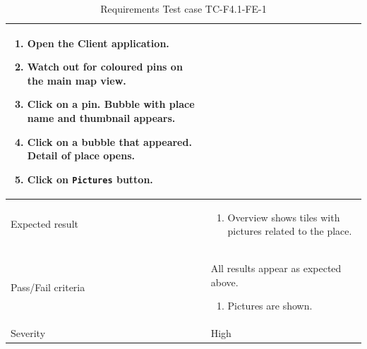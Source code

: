 \documentclass[11pt]{book}
\begin{document}
\begin{table}
\begin{tabular}{| p{3cm} | p{9.5cm} |}
                            \begin{enumerate}
                              \item Open the Client application.
                              \item Watch out for coloured pins on the main map view.
                              \item Click on a pin. Bubble with place name and thumbnail appears.
                              \item Click on a bubble that appeared. Detail of place opens.
                              \item Click on \texttt{Pictures} button.
                            \end{enumerate} \\ \hline 
    Expected result       & \begin{enumerate}
                              \item Overview shows tiles with pictures related to the place.
                            \end{enumerate} \\ \hline 
    Pass/Fail criteria    & All results appear as expected above.
                            \begin{enumerate}
                              \item Pictures are shown.
                            \end{enumerate} \\ \hline 
    Severity              & High \\ \hline 
  \end{tabular}
  \caption{Requirements Test case TC-F4.1-FE-1}
  \label{tab:TCF4.1FE1}
\end{table}
\end{document}
